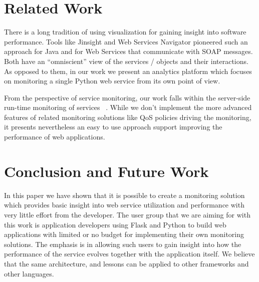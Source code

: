 \documentclass[conference]{IEEEtran}
\begin{document}
\section{Related Work}
\label{sec:related}


There is a long tradition of using visualization for gaining insight into software performance. Tools like Jinsight \cite{Pauw02a} and Web Services Navigator \cite{Pauw05} pioneered such an approach for Java and for Web Services that communicate with SOAP messages. Both have an ``omniscient'' view of the services / objects and their interactions. As opposed to them, in our work we present an analytics platform which focuses on monitoring a single Python web service from its own point of view.

From the perspective of service monitoring, our work falls within the server-side run-time monitoring of services ~\cite{ghezzi2007run}. While we don't implement the more advanced features of related monitoring solutions like QoS policies driving the monitoring, it presents nevertheless an easy to use approach support improving the performance of web applications. 




\section{Conclusion and Future Work}
\label{sec:conclusions}


In this paper we have shown that it is possible to create a monitoring solution which provides basic insight into web service utilization and performance  with very little effort from the developer. The user group that we are aiming for with this work is application developers using Flask and Python to build web applications with limited or no budget for implementing their own monitoring solutions. The emphasis is in allowing such users to gain insight into how the performance of the service evolves together with the application itself. We believe that the same architecture, and lessons can be applied to other frameworks and other languages.
\end{document}
